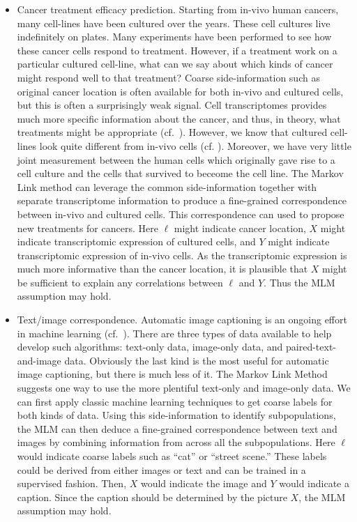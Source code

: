 \begin{itemize}
    \item Cancer treatment efficacy prediction.  Starting from in-vivo human cancers, many cell-lines have been cultured over the years.  These cell cultures live indefinitely on plates.  Many experiments have been performed to see how these cancer cells respond to treatment.  However, if a treatment work on a particular cultured cell-line, what can we say about which kinds of cancer might respond well to that treatment?  Coarse side-information such as original cancer location is often available for both in-vivo and cultured cells, but this is often a surprisingly weak signal.  Cell transcriptomes provides much more specific information about the cancer, and thus, in theory, what treatments might be appropriate (cf.\ \cite{cieslik2018cancer}).  However, we know that cultured cell-lines look quite different from in-vivo cells (cf. \cite{imamura2015comparison,haibe2013inconsistency}).  Moreover, we have very little joint measurement between the human cells which originally gave rise to a cell culture and the cells that survived to beceome the cell line.  The Markov Link method can leverage the common side-information together with separate transcriptome information to produce a fine-grained correspondence between in-vivo and cultured cells.  This correspondence can used to propose new treatments for cancers.  Here $\ell$ might indicate cancer location, $X$ might indicate transcriptomic expression of cultured cells, and $Y$ might indicate transcriptomic expression of in-vivo cells.  As the transcriptomic expression is much more informative than the cancer location, it is plausible that $X$ might be sufficient to explain any correlations between $\ell$ and $Y$.  Thus the MLM assumption may hold.

    \item Text/image correspondence.  Automatic image captioning is an ongoing effort in machine learning (cf.\ \cite{srivastava2018survey}).  There are three types of data available to help develop such algorithms: text-only data, image-only data, and paired-text-and-image data.  Obviously the last kind is the most useful for automatic image captioning, but there is much less of it.  The Markov Link Method suggests one way to use the more plentiful text-only and image-only data.  We can first apply classic machine learning techniques to get coarse labels for both kinds of data.  Using this side-information to identify subpopulations, the MLM can then deduce a fine-grained correspondence between text and images by combining information from across all the subpopulations.  Here $\ell$ would indicate coarse labels such as ``cat'' or ``street scene.''  These labels could be derived from either images or text and can be trained in a supervised fashion.  Then, $X$ would indicate the image and $Y$ would indicate a caption.  Since the caption should be determined by the picture $X$, the MLM assumption may hold.  


\end{itemize}
